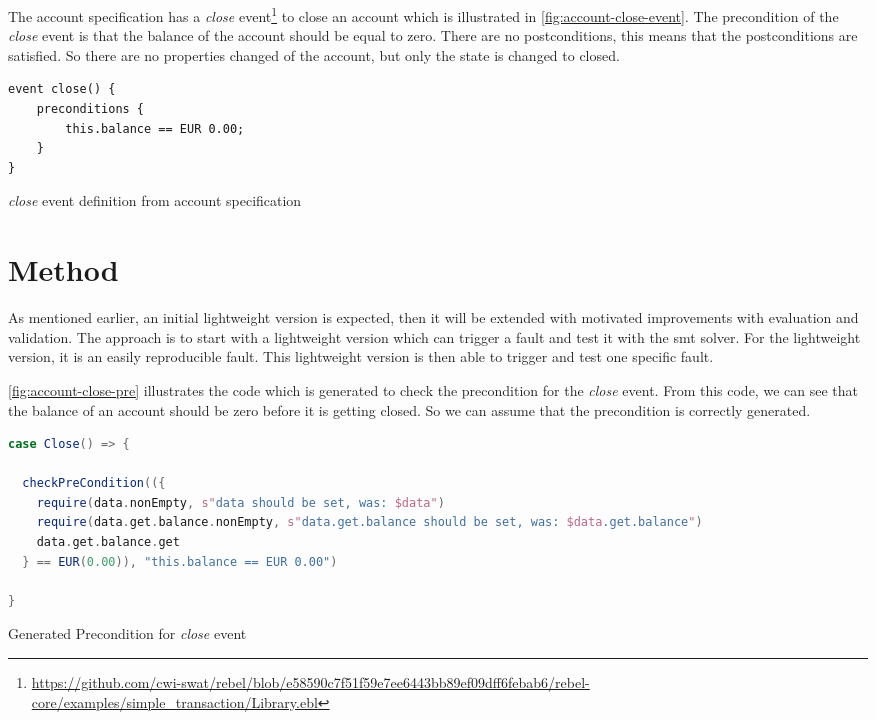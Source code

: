 The account specification has a \textit{close} event\footnote{\url{https://github.com/cwi-swat/rebel/blob/e58590c7f51f59e7ee6443bb89ef09dff6febab6/rebel-core/examples/simple_transaction/Library.ebl}}
to close an account which is illustrated in \autoref{fig:account-close-event}.
The precondition of the \textit{close} event is that the balance of the account should be
equal to zero. There are no postconditions, this means that the postconditions
are satisfied. So there are no properties changed of the account, but only the state
is changed to closed.

\begin{sourcecode}[h!]
\begin{lstlisting}[]
event close() {
	preconditions {
		this.balance == EUR 0.00;
	}
}
\end{lstlisting}
\caption{\textit{close} event definition from account specification}\label{fig:account-close-event}
\end{sourcecode}
\FloatBarrier

\section{Method}\label{sec:ch3-method}

As mentioned earlier, an initial lightweight version is expected, then it will
be extended with motivated improvements with evaluation and validation. The
approach is to start with a lightweight version which can trigger a fault
and test it with the \gls{smt} solver. For the lightweight version, it is an easily
reproducible fault. This lightweight version is then able to trigger and test one
specific fault.

\autoref{fig:account-close-pre} illustrates the code which is generated to check
the precondition for the \textit{close} event. From this code, we can see that the
balance of an account should be zero before it is getting closed. So we can
assume that the precondition is correctly generated.

\begin{sourcecode}[h!]
\begin{lstlisting}[language=scala]
case Close() => {

  checkPreCondition(({
    require(data.nonEmpty, s"data should be set, was: $data")
    require(data.get.balance.nonEmpty, s"data.get.balance should be set, was: $data.get.balance")
    data.get.balance.get
  } == EUR(0.00)), "this.balance == EUR 0.00")

}
\end{lstlisting}
\caption{Generated Precondition for \textit{close} event}\label{fig:account-close-pre}
\end{sourcecode}
\FloatBarrier

